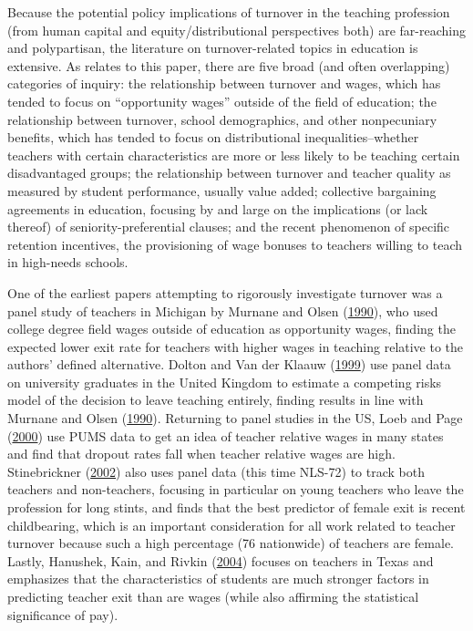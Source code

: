 \documentclass[12pt,]{article}
\begin{document}
Because the potential policy implications of turnover in the teaching
profession (from human capital and equity/distributional perspectives
both) are far-reaching and polypartisan, the literature on
turnover-related topics in education is extensive. As relates to this
paper, there are five broad (and often overlapping) categories of
inquiry: the relationship between turnover and wages, which has tended
to focus on ``opportunity wages'' outside of the field of education; the
relationship between turnover, school demographics, and other
nonpecuniary benefits, which has tended to focus on distributional
inequalities--whether teachers with certain characteristics are more or
less likely to be teaching certain disadvantaged groups; the
relationship between turnover and teacher quality as measured by student
performance, usually value added; collective bargaining agreements in
education, focusing by and large on the implications (or lack thereof)
of seniority-preferential clauses; and the recent phenomenon of specific
retention incentives, the provisioning of wage bonuses to teachers
willing to teach in high-needs schools.

One of the earliest papers attempting to rigorously investigate turnover
was a panel study of teachers in Michigan by Murnane and Olsen
(\protect\hyperlink{ref-murnane}{1990}), who used college degree field
wages outside of education as opportunity wages, finding the expected
lower exit rate for teachers with higher wages in teaching relative to
the authors' defined alternative. Dolton and Van der Klaauw
(\protect\hyperlink{ref-dolton}{1999}) use panel data on university
graduates in the United Kingdom to estimate a competing risks model of
the decision to leave teaching entirely, finding results in line with
Murnane and Olsen (\protect\hyperlink{ref-murnane}{1990}). Returning to
panel studies in the US, Loeb and Page
(\protect\hyperlink{ref-loeb}{2000}) use PUMS data to get an idea of
teacher relative wages in many states and find that dropout rates fall
when teacher relative wages are high. Stinebrickner
(\protect\hyperlink{ref-stinebrickner}{2002}) also uses panel data (this
time NLS-72) to track both teachers and non-teachers, focusing in
particular on young teachers who leave the profession for long stints,
and finds that the best predictor of female exit is recent childbearing,
which is an important consideration for all work related to teacher
turnover because such a high percentage (76 nationwide) of teachers are
female. Lastly, Hanushek, Kain, and Rivkin
(\protect\hyperlink{ref-hanushek}{2004}) focuses on teachers in Texas
and emphasizes that the characteristics of students are much stronger
factors in predicting teacher exit than are wages (while also affirming
the statistical significance of pay).
\end{document}

